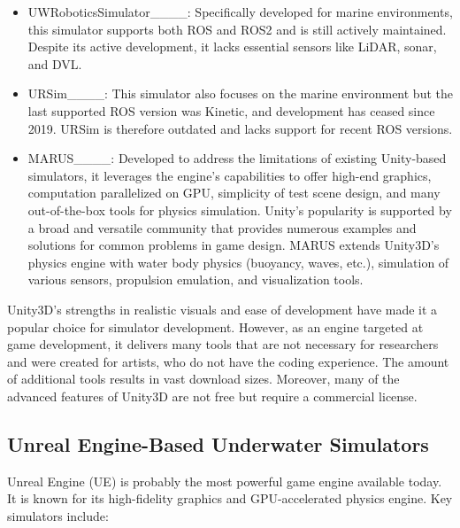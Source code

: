 \begin{itemize}


\item UWRoboticsSimulator____: Specifically developed for marine environments, this simulator supports both ROS and ROS2 and is still actively maintained. Despite its active development, it lacks essential sensors like LiDAR, sonar, and DVL.

\item URSim____: This simulator also focuses on the marine environment but the last supported ROS version was Kinetic, and development has ceased since 2019. URSim is therefore outdated and lacks support for recent ROS versions.

\item MARUS____: Developed to address the limitations of existing Unity-based simulators, it leverages the engine's capabilities to offer high-end graphics, computation parallelized on GPU, simplicity of test scene design, and many out-of-the-box tools for physics simulation. Unity’s popularity is supported by a broad and versatile community that provides numerous examples and solutions for common problems in game design. MARUS extends Unity3D’s physics engine with water body physics (buoyancy, waves, etc.), simulation of various sensors, propulsion emulation, and visualization tools.

\end{itemize}

Unity3D's strengths in realistic visuals and ease of development have made it a popular choice for simulator development. However, as an engine targeted at game development, it delivers many tools that are not necessary for researchers and were created for artists, who do not have the coding experience. The amount of additional tools results in vast download sizes. Moreover, many of the advanced features of Unity3D are not free but require a commercial license.



\subsection{Unreal Engine-Based Underwater Simulators}

Unreal Engine (UE) is probably the most powerful game engine available today. It is known for its high-fidelity graphics and GPU-accelerated physics engine. Key simulators include:

